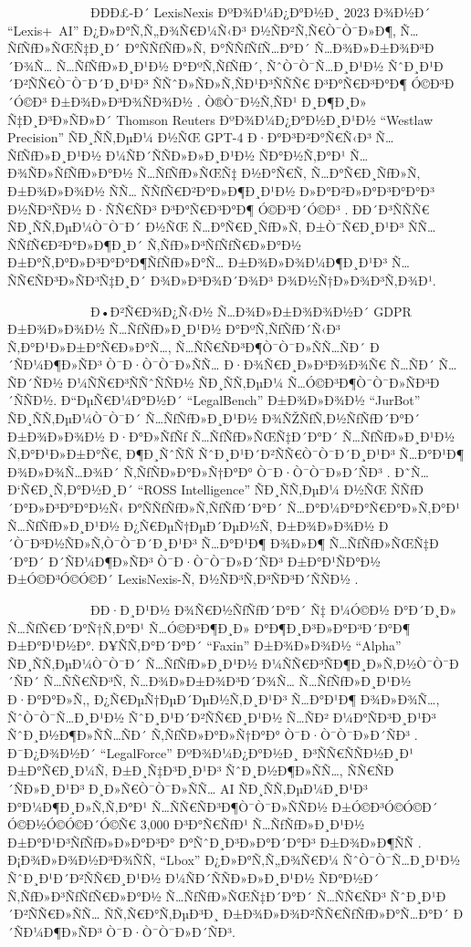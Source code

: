 \documentclass[12pt,A4]{report}
\begin{document}
\ \ \ \ \ \ \ \ \  \ \ \ \ ÐÐÐ£-Ð´ LexisNexis ÐºÐ¾Ð¼Ð¿Ð°Ð½Ð¸ 2023 Ð¾Ð½Ð´ ``Lexis+~AI''
Ð¿Ð»Ð°Ñ‚Ñ„Ð¾Ñ€Ð¼Ñ‹Ð³ Ð½ÑÐ²Ñ‚Ñ€Ò¯Ò¯Ð»Ð¶, Ñ…ÑƒÑƒÐ»ÑŒÑ‡Ð¸Ð´ Ð°ÑÑƒÑƒÐ»Ñ‚ Ð°ÑÑƒÑƒÑ…Ð°Ð´ Ñ…Ð¾Ð»Ð±Ð¾Ð³Ð´Ð¾Ñ… Ñ…ÑƒÑƒÐ»Ð¸Ð¹Ð½ Ð°ÐºÑ‚ÑƒÑƒÐ´,
ÑˆÒ¯Ò¯Ñ…Ð¸Ð¹Ð½ ÑˆÐ¸Ð¹Ð´Ð²ÑÑ€Ò¯Ò¯Ð´Ð¸Ð¹Ð³ ÑÑˆÐ»ÑÐ»Ñ‚ÑÐ¹Ð³ÑÑÑ€ Ð³Ð°Ñ€Ð³Ð°Ð¶ Ó©Ð³Ð´Ó©Ð³ Ð±Ð¾Ð»Ð³Ð¾ÑÐ¾Ð½
\cite{lexisnexis2023}. Ò®Ò¯Ð½Ñ‚ÑÐ¹ Ð¸Ð¶Ð¸Ð» Ñ‡Ð¸Ð³Ð»ÑÐ»Ð´ Thomson Reuters ÐºÐ¾Ð¼Ð¿Ð°Ð½Ð¸Ð¹Ð½
``Westlaw Precision'' ÑÐ¸ÑÑ‚ÐµÐ¼ Ð½ÑŒ GPT-4 Ð·Ð°Ð³Ð²Ð°Ñ€Ñ‹Ð³ Ñ…ÑƒÑƒÐ»Ð¸Ð¹Ð½ Ð¼ÑÐ´ÑÑÐ»Ð»Ð¸Ð¹Ð½
ÑÐ°Ð½Ñ‚Ð°Ð¹ Ñ…Ð¾ÑÐ»ÑƒÑƒÐ»Ð°Ð½ Ñ…ÑƒÑƒÐ»ÑŒÑ‡ Ð½Ð°Ñ€Ñ‚ Ñ…Ð°Ñ€Ð¸ÑƒÐ»Ñ‚ Ð±Ð¾Ð»Ð¾Ð½ ÑÑ… ÑÑƒÑ€Ð²Ð°Ð»Ð¶Ð¸Ð¹Ð½ Ð»Ð°Ð²Ð»Ð°Ð³Ð°Ð°Ð³
Ð½ÑÐ³ÑÐ½ Ð·ÑÑ€ÑÐ³ Ð³Ð°Ñ€Ð³Ð°Ð¶ Ó©Ð³Ð´Ó©Ð³ \cite{thomsonreuters2023}. Ð­Ð´Ð³ÑÑÑ€ ÑÐ¸ÑÑ‚ÐµÐ¼Ò¯Ò¯Ð´
Ð½ÑŒ Ñ…Ð°Ñ€Ð¸ÑƒÐ»Ñ‚ Ð±Ò¯Ñ€Ð¸Ð¹Ð³ ÑÑ… ÑÑƒÑ€Ð²Ð°Ð»Ð¶Ð¸Ð´ Ñ‚ÑƒÐ»Ð³ÑƒÑƒÑ€Ð»Ð°Ð½ Ð±Ð°Ñ‚Ð°Ð»Ð³Ð°Ð°Ð¶ÑƒÑƒÐ»Ð°Ñ… Ð±Ð¾Ð»Ð¾Ð¼Ð¶Ð¸Ð¹Ð³
Ñ…ÑÑ€ÑÐ³Ð»ÑÐ³Ñ‡Ð¸Ð´ Ð¾Ð»Ð³Ð¾Ð´Ð¾Ð³ Ð¾Ð½Ñ†Ð»Ð¾Ð³Ñ‚Ð¾Ð¹.

\ \ \ \ \ \ \ \ \  \ \ \ \ Ð•Ð²Ñ€Ð¾Ð¿Ñ‹Ð½ Ñ…Ð¾Ð»Ð±Ð¾Ð¾Ð½Ð´ GDPR Ð±Ð¾Ð»Ð¾Ð½ Ñ…ÑƒÑƒÐ»Ð¸Ð¹Ð½ Ð°ÐºÑ‚ÑƒÑƒÐ´Ñ‹Ð³
Ñ‚Ð°Ð¹Ð»Ð±Ð°Ñ€Ð»Ð°Ñ…, Ñ…ÑÑ€ÑÐ³Ð¶Ò¯Ò¯Ð»ÑÑ…ÑÐ´ Ð´ÑÐ¼Ð¶Ð»ÑÐ³ Ò¯Ð·Ò¯Ò¯Ð»ÑÑ… Ð·Ð¾Ñ€Ð¸Ð»Ð³Ð¾Ð¾Ñ€ Ñ…ÑÐ´ Ñ…ÑÐ´ÑÐ½
Ð¼ÑÑ€Ð³ÑÑˆÑÑÐ½ ÑÐ¸ÑÑ‚ÐµÐ¼ Ñ…Ó©Ð³Ð¶Ò¯Ò¯Ð»ÑÐ³Ð´ÑÑÐ½. Ð“ÐµÑ€Ð¼Ð°Ð½Ð´ ``LegalBench'' Ð±Ð¾Ð»Ð¾Ð½ ``JurBot''
ÑÐ¸ÑÑ‚ÐµÐ¼Ò¯Ò¯Ð´ Ñ…ÑƒÑƒÐ»Ð¸Ð¹Ð½ Ð¾ÑŽÑƒÑ‚Ð½ÑƒÑƒÐ´Ð°Ð´ Ð±Ð¾Ð»Ð¾Ð½ Ð·Ð°Ð»ÑƒÑƒ Ñ…ÑƒÑƒÐ»ÑŒÑ‡Ð´Ð°Ð´ Ñ…ÑƒÑƒÐ»Ð¸Ð¹Ð½ Ñ‚Ð°Ð¹Ð»Ð±Ð°Ñ€,
Ð¶Ð¸ÑˆÑÑ ÑˆÐ¸Ð¹Ð´Ð²ÑÑ€Ò¯Ò¯Ð´Ð¸Ð¹Ð³ Ñ…Ð°Ð¹Ð¶ Ð¾Ð»Ð¾Ñ…Ð¾Ð´ Ñ‚ÑƒÑÐ»Ð°Ð»Ñ†Ð°Ð° Ò¯Ð·Ò¯Ò¯Ð»Ð´ÑÐ³
\cite{niklaus2021swiss}. Ð˜Ñ… Ð‘Ñ€Ð¸Ñ‚Ð°Ð½Ð¸Ð´ ``ROSS Intelligence'' ÑÐ¸ÑÑ‚ÐµÐ¼ Ð½ÑŒ
ÑÑƒÐ´Ð°Ð»Ð³Ð°Ð°Ð½Ñ‹ Ð°ÑÑƒÑƒÐ»Ñ‚ÑƒÑƒÐ´Ð°Ð´ Ñ…Ð°Ð¼Ð°Ð°Ñ€Ð°Ð»Ñ‚Ð°Ð¹ Ñ…ÑƒÑƒÐ»Ð¸Ð¹Ð½ Ð¿Ñ€ÐµÑ†ÐµÐ´ÐµÐ½Ñ‚ Ð±Ð¾Ð»Ð¾Ð½ Ð´Ò¯Ð³Ð½ÑÐ»Ñ‚Ò¯Ò¯Ð´Ð¸Ð¹Ð³
Ñ…Ð°Ð¹Ð¶ Ð¾Ð»Ð¶ Ñ…ÑƒÑƒÐ»ÑŒÑ‡Ð´Ð°Ð´ Ð´ÑÐ¼Ð¶Ð»ÑÐ³ Ò¯Ð·Ò¯Ò¯Ð»Ð´ÑÐ³ Ð±Ð°Ð¹ÑÐ°Ð½ Ð±Ó©Ð³Ó©Ó©Ð´ LexisNexis-Ñ‚
Ð½ÑÐ³Ñ‚Ð³ÑÐ³Ð´ÑÑÐ½ \cite{ross2023}.

\ \ \ \ \ \ \ \ \  \ \ \ \ ÐÐ·Ð¸Ð¹Ð½ Ð¾Ñ€Ð½ÑƒÑƒÐ´Ð°Ð´ Ñ‡ Ð¼Ó©Ð½ Ð°Ð´Ð¸Ð» Ñ…ÑƒÑ€Ð´Ð°Ñ†Ñ‚Ð°Ð¹ Ñ…Ó©Ð³Ð¶Ð¸Ð»
Ð°Ð¶Ð¸Ð³Ð»Ð°Ð³Ð´Ð°Ð¶ Ð±Ð°Ð¹Ð½Ð°. Ð¥ÑÑ‚Ð°Ð´Ð°Ð´ ``Faxin'' Ð±Ð¾Ð»Ð¾Ð½ ``Alpha'' ÑÐ¸ÑÑ‚ÐµÐ¼Ò¯Ò¯Ð´ Ñ…ÑƒÑƒÐ»Ð¸Ð¹Ð½
Ð¼ÑÑ€Ð³ÑÐ¶Ð¸Ð»Ñ‚Ð½Ò¯Ò¯Ð´ÑÐ´ Ñ…ÑÑ€ÑÐ³Ñ‚ Ñ…Ð¾Ð»Ð±Ð¾Ð³Ð´Ð¾Ñ… Ñ…ÑƒÑƒÐ»Ð¸Ð¹Ð½ Ð·Ð°Ð°Ð»Ñ‚, Ð¿Ñ€ÐµÑ†ÐµÐ´ÐµÐ½Ñ‚Ð¸Ð¹Ð³ Ñ…Ð°Ð¹Ð¶ Ð¾Ð»Ð¾Ñ…,
ÑˆÒ¯Ò¯Ñ…Ð¸Ð¹Ð½ ÑˆÐ¸Ð¹Ð´Ð²ÑÑ€Ð¸Ð¹Ð½ Ñ…ÑÐ² Ð¼Ð°ÑÐ³Ð¸Ð¹Ð³ ÑˆÐ¸Ð½Ð¶Ð»ÑÑ…ÑÐ´ Ñ‚ÑƒÑÐ»Ð°Ð»Ñ†Ð°Ð° Ò¯Ð·Ò¯Ò¯Ð»Ð´ÑÐ³
\cite{he2021legal}. Ð¯Ð¿Ð¾Ð½Ð´ ``LegalForce'' ÐºÐ¾Ð¼Ð¿Ð°Ð½Ð¸ Ð³ÑÑ€ÑÑÐ½Ð¸Ð¹ Ð±Ð°Ñ€Ð¸Ð¼Ñ‚
Ð±Ð¸Ñ‡Ð³Ð¸Ð¹Ð³ ÑˆÐ¸Ð½Ð¶Ð»ÑÑ…, ÑÑ€ÑÐ´ÑÐ»Ð¸Ð¹Ð³ Ð¸Ð»Ñ€Ò¯Ò¯Ð»ÑÑ… AI ÑÐ¸ÑÑ‚ÐµÐ¼Ð¸Ð¹Ð³ Ð°Ð¼Ð¶Ð¸Ð»Ñ‚Ñ‚Ð°Ð¹
Ñ…ÑÑ€ÑÐ³Ð¶Ò¯Ò¯Ð»ÑÑÐ½ Ð±Ó©Ð³Ó©Ó©Ð´ Ó©Ð½Ó©Ó©Ð´Ó©Ñ€ 3,000 Ð³Ð°Ñ€ÑƒÐ¹ Ñ…ÑƒÑƒÐ»Ð¸Ð¹Ð½ Ð±Ð°Ð¹Ð³ÑƒÑƒÐ»Ð»Ð°Ð³Ð° Ð°ÑˆÐ¸Ð³Ð»Ð°Ð´Ð°Ð³
Ð±Ð¾Ð»Ð¶ÑÑ \cite{legalforce2022}. Ð¡Ð¾Ð»Ð¾Ð½Ð³Ð¾ÑÑ‚ ``Lbox'' Ð¿Ð»Ð°Ñ‚Ñ„Ð¾Ñ€Ð¼ ÑˆÒ¯Ò¯Ñ…Ð¸Ð¹Ð½
ÑˆÐ¸Ð¹Ð´Ð²ÑÑ€Ð¸Ð¹Ð½ Ð¼ÑÐ´ÑÑÐ»Ð»Ð¸Ð¹Ð½ ÑÐ°Ð½Ð´ Ñ‚ÑƒÐ»Ð³ÑƒÑƒÑ€Ð»Ð°Ð½ Ñ…ÑƒÑƒÐ»ÑŒÑ‡Ð´Ð°Ð´ Ñ…ÑÑ€ÑÐ³ ÑˆÐ¸Ð¹Ð´Ð²ÑÑ€Ð»ÑÑ…
ÑÑ‚Ñ€Ð°Ñ‚ÐµÐ³Ð¸ Ð±Ð¾Ð»Ð¾Ð²ÑÑ€ÑƒÑƒÐ»Ð°Ñ…Ð°Ð´ Ð´ÑÐ¼Ð¶Ð»ÑÐ³ Ò¯Ð·Ò¯Ò¯Ð»Ð´ÑÐ³.
\end{document}
